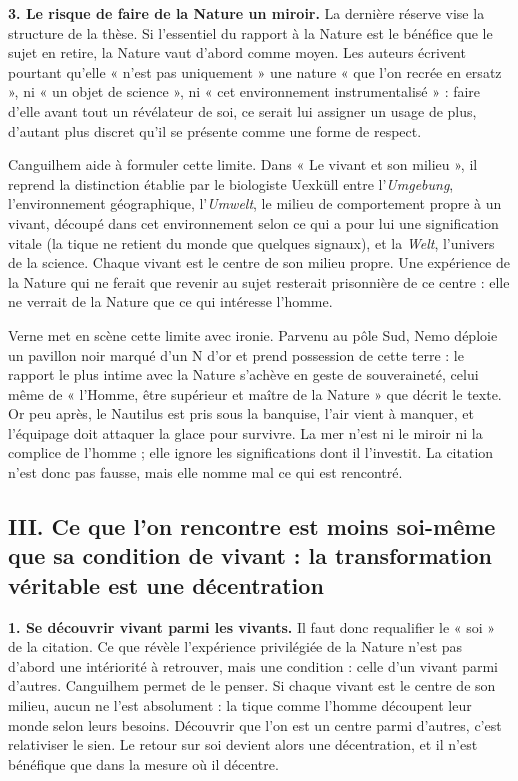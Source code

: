 \documentclass[11pt,a4paper]{article}
\begin{document}
\textbf{3. Le risque de faire de la Nature un miroir.} La dernière réserve vise la structure de la thèse. Si l'essentiel du rapport à la Nature est le bénéfice que le sujet en retire, la Nature vaut d'abord comme moyen. Les auteurs écrivent pourtant qu'elle « n'est pas uniquement » une nature « que l'on recrée en ersatz », ni « un objet de science », ni « cet environnement instrumentalisé » : faire d'elle avant tout un révélateur de soi, ce serait lui assigner un usage de plus, d'autant plus discret qu'il se présente comme une forme de respect.

Canguilhem aide à formuler cette limite. Dans « Le vivant et son milieu », il reprend la distinction établie par le biologiste Uexküll entre l'\emph{Umgebung}, l'environnement géographique, l'\emph{Umwelt}, le milieu de comportement propre à un vivant, découpé dans cet environnement selon ce qui a pour lui une signification vitale (la tique ne retient du monde que quelques signaux), et la \emph{Welt}, l'univers de la science. Chaque vivant est le centre de son milieu propre. Une expérience de la Nature qui ne ferait que revenir au sujet resterait prisonnière de ce centre : elle ne verrait de la Nature que ce qui intéresse l'homme.

Verne met en scène cette limite avec ironie. Parvenu au pôle Sud, Nemo déploie un pavillon noir marqué d'un N d'or et prend possession de cette terre : le rapport le plus intime avec la Nature s'achève en geste de souveraineté, celui même de « l'Homme, être supérieur et maître de la Nature » que décrit le texte. Or peu après, le Nautilus est pris sous la banquise, l'air vient à manquer, et l'équipage doit attaquer la glace pour survivre. La mer n'est ni le miroir ni la complice de l'homme ; elle ignore les significations dont il l'investit. La citation n'est donc pas fausse, mais elle nomme mal ce qui est rencontré.

\hypertarget{iii.-ce-que-lon-rencontre-est-moins-soi-muxeame-que-sa-condition-de-vivant-la-transformation-vuxe9ritable-est-une-duxe9centration}{%
\subsection{III. Ce que l'on rencontre est moins soi-même que sa condition de vivant : la transformation véritable est une décentration}\label{iii.-ce-que-lon-rencontre-est-moins-soi-muxeame-que-sa-condition-de-vivant-la-transformation-vuxe9ritable-est-une-duxe9centration}}

\textbf{1. Se découvrir vivant parmi les vivants.} Il faut donc requalifier le « soi » de la citation. Ce que révèle l'expérience privilégiée de la Nature n'est pas d'abord une intériorité à retrouver, mais une condition : celle d'un vivant parmi d'autres. Canguilhem permet de le penser. Si chaque vivant est le centre de son milieu, aucun ne l'est absolument : la tique comme l'homme découpent leur monde selon leurs besoins. Découvrir que l'on est un centre parmi d'autres, c'est relativiser le sien. Le retour sur soi devient alors une décentration, et il n'est bénéfique que dans la mesure où il décentre.
\end{document}
